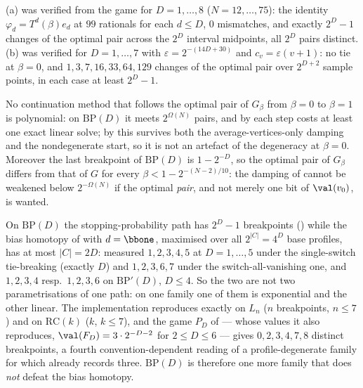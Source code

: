 \begin{remark}\label{pp:robust-measured}
(a) was verified from the game for $D=1,\dots,8$ ($N=12,\dots,75$): the identity
$\varphi_d=T^{d}(\beta)e_d$ at $99$ rationals for each $d\le D$, $0$ mismatches,
and exactly $2^{D}-1$ changes of the optimal pair across the $2^{D}$ interval
midpoints, all $2^{D}$ pairs distinct. (b) was verified for $D=1,\dots,7$ with
$\varepsilon=2^{-(14D+30)}$ and $c_v=\varepsilon(v+1)$: no tie at $\beta=0$, and
$1,3,7,16,33,64,129$ changes of the optimal pair over $2^{D+2}$ sample points,
in each case at least $2^{D}-1$.
\end{remark}

\begin{corollary}\label{pp:barrier}
No continuation method that follows the optimal pair of $G_\beta$ from $\beta=0$
to $\beta=1$ is polynomial: on $\mathrm{BP}(D)$ it meets $2^{\Omega(N)}$ pairs,
and by  each step costs at least one exact linear solve; by
 this survives both the
average-vertices-only damping and the nondegenerate start, so it is not an
artefact of the degeneracy at $\beta=0$. Moreover the last breakpoint of $\mathrm{BP}(D)$ is
$1-2^{-D}$, so the optimal pair of $G_\beta$ differs from that of $G$ for every
$\beta<1-2^{-(N-2)/10}$: the damping of  cannot be
weakened below $2^{-\Omega(N)}$ if the optimal \emph{pair}, and not merely one
bit of $\val(v_0)$, is wanted.
\end{corollary}


\begin{proposition}\label{pp:separation}
On $\mathrm{BP}(D)$ the stopping-probability path has $2^{D}-1$ breakpoints
() while the bias homotopy of  with $d=\bbone$,
maximised over all $2^{|C|}=4^{D}$ base profiles, has at most $|C|=2D$:
measured $1,2,3,4,5$ at $D=1,\dots,5$ under the single-switch tie-breaking
(exactly $D$) and $1,2,3,6,7$ under the switch-all-vanishing one, and
$1,2,3,4$ resp.\ $1,2,3,6$ on $\mathrm{BP}'(D)$, $D\le4$. So the two are not two parametrisations of one
path: on one family one of them is exponential and the other linear. The
implementation reproduces  exactly on $L_n$ ($n$
breakpoints, $n\le7$) and on $\mathrm{RC}(k)$ ($k$, $k\le7$), and the game
$P_D$ of  --- whose values it also reproduces, $\val(F_D)=3\cdot
2^{-D-2}$ for $2\le D\le6$ --- gives $0,2,3,4,7,8$ distinct breakpoints, a
fourth convention-dependent reading of a profile-degenerate family for which
 already records three. $\mathrm{BP}(D)$ is therefore
one more family that does \emph{not} defeat the bias homotopy.
\end{proposition}

